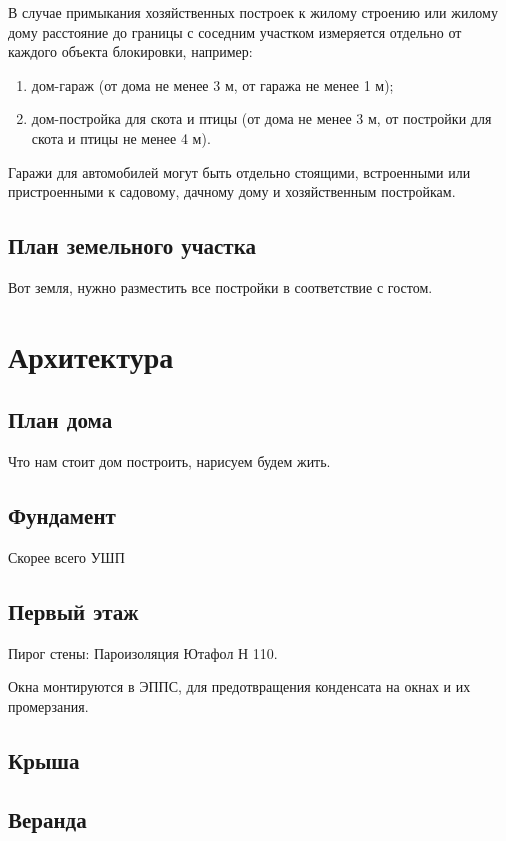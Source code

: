 \documentclass[12pt, twocolumn]{report}
\begin{document}
В случае примыкания хозяйственных построек к жилому строению или жилому дому расстояние до границы с соседним участком измеряется отдельно от каждого объекта блокировки, например:

\begin{enumerate}
	\item дом-гараж (от дома не менее 3 м, от гаража не менее 1 м);
	\item дом-постройка для скота и птицы (от дома не менее 3 м, от постройки для скота и птицы не менее 4 м).
\end{enumerate}

Гаражи для автомобилей могут быть отдельно стоящими, встроенными или пристроенными к садовому, дачному дому и хозяйственным постройкам.

\chapter{План земельного участка}
Вот земля, нужно разместить все постройки в соответствие с гостом.	


\part{Архитектура}
\chapter{План дома}
Что нам стоит дом построить, нарисуем будем жить.


\chapter{Фундамент}

Скорее всего УШП

\chapter{Первый этаж}

Пирог стены:
Пароизоляция Ютафол Н 110.

Окна монтируются в ЭППС, для предотвращения конденсата на окнах и их промерзания.

\chapter{Крыша}

\chapter{Веранда}
\end{document}
